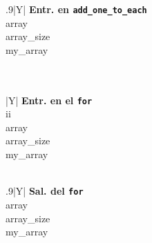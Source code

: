 \documentclass[a4paper]{article}
\begin{document}
\begin{table}[H]
    \begin{subfigure}{0.4\linewidth}
        \centering
        \begin{tabularx}{.9\linewidth}{|Y|}
        \hline
        \textbf{Entr. en \texttt{add\_one\_to\_each}} \\\hline
        array\\\hline
        array\_size\\\hline
        my\_array\\\hline
        \\ \hline
        \\ \hline
        \end{tabularx}
    \end{subfigure}%
    \begin{subfigure}{0.2\linewidth}
        \centering
        \begin{tabularx}{\linewidth}{|Y|}
        \hline
        \textbf{Entr. en el \texttt{for}} \\\hline
        ii\\\hline
        array\\\hline
        array\_size\\\hline
        my\_array\\\hline
        \\ \hline
        \end{tabularx}
    \end{subfigure}%
    \begin{subfigure}{0.4\linewidth}
        \centering
        \begin{tabularx}{.9\linewidth}{|Y|}
        \hline
        \textbf{Sal. del \texttt{for}}\\\hline
        array\\\hline
        array\_size\\\hline
        my\_array\\\hline
        \\ \hline
        \\ \hline
        \end{tabularx}
    \end{subfigure}%



\end{table}
\end{document}
